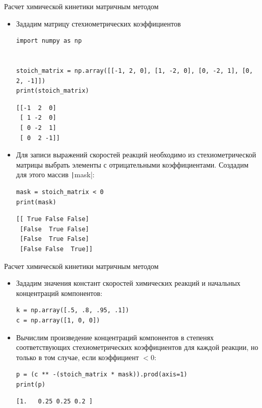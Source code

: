\documentclass[aspectratio=169, mathserif]{beamer}	%
\begin{document}
\begin{frame}[fragile, label=c]{Расчет химической кинетики матричным методом}
\scriptsize
\begin{itemize}
\item Зададим матрицу стехиометрических коэффициентов
\begin{verbatim}
import numpy as np


stoich_matrix = np.array([[-1, 2, 0], [1, -2, 0], [0, -2, 1], [0, 2, -1]])
print(stoich_matrix)
\end{verbatim}
\vfill
\begin{verbatim}
[[-1  2  0]
 [ 1 -2  0]
 [ 0 -2  1]
 [ 0  2 -1]]
\end{verbatim}
\vfill
\item Для записи выражений скоростей реакций необходимо из стехиометрической матрицы выбрать элементы с отрицательными коэффициентами. Создадим для этого массив \texttt|mask|:
\vfill
\begin{verbatim}
mask = stoich_matrix < 0
print(mask)
\end{verbatim}
\vfill
\begin{verbatim}
[[ True False False]
 [False  True False]
 [False  True False]
 [False False  True]]
\end{verbatim}
\end{itemize}
\vfill
\end{frame}


\begin{frame}[fragile, label=c]{Расчет химической кинетики матричным методом}
\scriptsize
\begin{itemize}
\item Зададим значения констант скоростей химических реакций и начальных концентраций компонентов:
\begin{verbatim}
k = np.array([.5, .8, .95, .1])
c = np.array([1, 0, 0])
\end{verbatim}
\vfill
\item Вычислим произведение концентраций компонентов в степенях соответствующих стехиометрических коэффициентов для каждой реакции, но только в том случае, если коэффициент $< 0$:
\vfill
\begin{verbatim}
p = (c ** -(stoich_matrix * mask)).prod(axis=1)
print(p)
\end{verbatim}
\vfill
\begin{verbatim}
[1.   0.25 0.25 0.2 ]
\end{verbatim}
\end{itemize}
\vfill
\end{frame}
\end{document}
